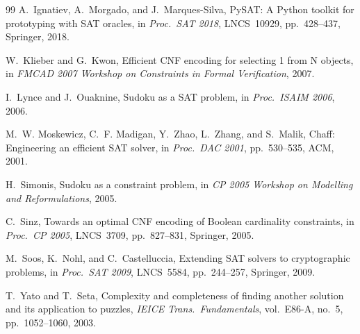 \documentclass[preprint,10pt,authoryear]{elsarticle}
\begin{document}
\begin{thebibliography}{99}
A.~Ignatiev, A.~Morgado, and J.~Marques-Silva,
{PySAT}: A {Python} toolkit for prototyping with {SAT} oracles,
in \textit{Proc.\ SAT 2018}, LNCS~10929, pp.~428--437, Springer, 2018.

W.~Klieber and G.~Kwon,
Efficient {CNF} encoding for selecting 1 from {N} objects,
in \textit{FMCAD 2007 Workshop on Constraints in Formal Verification}, 2007.

I.~Lynce and J.~Ouaknine,
Sudoku as a {SAT} problem,
in \textit{Proc.\ ISAIM 2006}, 2006.

M.~W. Moskewicz, C.~F. Madigan, Y.~Zhao, L.~Zhang, and S.~Malik,
Chaff: Engineering an efficient {SAT} solver,
in \textit{Proc.\ DAC 2001}, pp.~530--535, ACM, 2001.

H.~Simonis,
Sudoku as a constraint problem,
in \textit{CP 2005 Workshop on Modelling and Reformulations}, 2005.

C.~Sinz,
Towards an optimal {CNF} encoding of Boolean cardinality constraints,
in \textit{Proc.\ CP 2005}, LNCS~3709, pp.~827--831, Springer, 2005.

M.~Soos, K.~Nohl, and C.~Castelluccia,
Extending {SAT} solvers to cryptographic problems,
in \textit{Proc.\ SAT 2009}, LNCS~5584, pp.~244--257, Springer, 2009.

T.~Yato and T.~Seta,
Complexity and completeness of finding another solution and its application
to puzzles,
\textit{IEICE Trans.\ Fundamentals}, vol.~E86-A, no.~5,
pp.~1052--1060, 2003.

\end{thebibliography}
\end{document}
